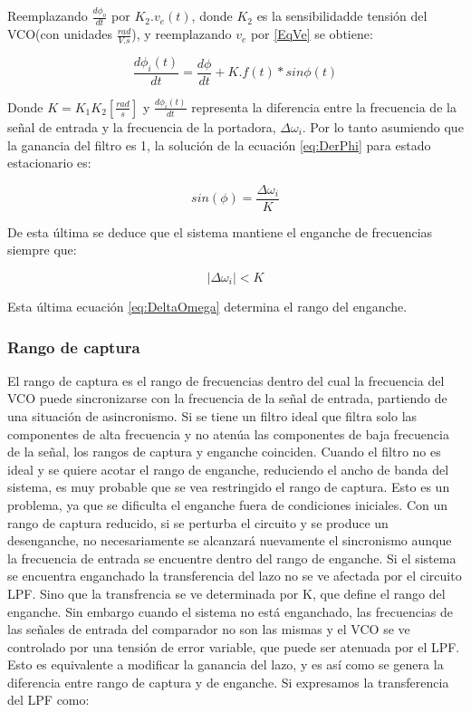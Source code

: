 \documentclass[10pt,a4paper]{article}
\begin{document}
Reemplazando $\frac{d\phi_o}{dt}$ por $K_2.v_e(t)$, donde $K_2$ es la sensibilidadde tensión del VCO(con unidades $\frac{rad}{V.s}$), y reemplazando $v_e$ por \ref{EqVe} se obtiene:

\begin{equation}
	\frac{d\phi_i(t)}{dt} = \frac{d\phi}{dt} +K.f(t)*sin\phi(t)
	\label{eq:DerPhi}
\end{equation}

Donde $K = K_1 K_2 [\frac{rad}{s}]$ y $\frac{d\phi_i(t)}{dt}$ representa la diferencia entre la frecuencia de la señal de entrada y la frecuencia de la portadora, $\Delta\omega_i$. Por lo tanto asumiendo que la ganancia del filtro es 1, la solución de la ecuación \ref{eq:DerPhi} para estado estacionario es:

\begin{equation}
	sin(\phi) = \frac{\Delta\omega_i}{K}
	\label{eq:SinPhi}
\end{equation}

De esta última se deduce que el sistema mantiene el enganche de frecuencias siempre que:

\begin{equation}
	|\Delta\omega_i|< K
	\label{eq:DeltaOmega}
\end{equation}

Esta última ecuación \ref{eq:DeltaOmega} determina el rango del enganche.

\subsubsection{Rango de captura}
El rango de captura es el rango de frecuencias dentro del cual la frecuencia del VCO puede sincronizarse con la
frecuencia de la señal de entrada, partiendo de una situación de asincronismo. Si se tiene un filtro ideal que filtra solo las componentes de alta frecuencia y no atenúa las componentes de baja frecuencia de la señal, los rangos de captura y enganche coinciden. Cuando el filtro no es ideal y se quiere acotar el rango de enganche, reduciendo el ancho de banda del sistema, es muy probable que se vea restringido el rango de captura. Esto es un problema, ya que se dificulta el enganche fuera de condiciones iniciales. Con un rango de captura reducido, si se perturba el circuito y se produce un desenganche, no necesariamente se alcanzará nuevamente el sincronismo aunque la frecuencia de entrada se encuentre dentro del rango de enganche.
Si el sistema se encuentra enganchado la transferencia del lazo no se ve afectada por el circuito LPF. Sino que la transfrencia se ve determinada por K, que define el rango del enganche. Sin embargo cuando el sistema no está enganchado, las frecuencias de las señales de entrada del comparador no son las mismas y el VCO se ve controlado por una tensión de error variable, que puede ser atenuada por el LPF. Esto es equivalente a modificar la ganancia del lazo, y es así como se genera la diferencia entre rango de captura y de enganche. Si expresamos la transferencia del LPF como:
\end{document}
